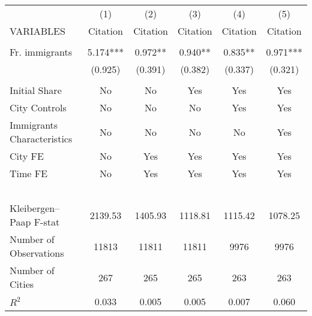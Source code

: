 \begin{tabular}{lccccc} \hline
 & (1) & (2) & (3) & (4) & (5) \\
VARIABLES & Citation & Citation & Citation & Citation & Citation \\ \hline
 &  &  &  &  &  \\
Fr. immigrants & 5.174*** & 0.972** & 0.940** & 0.835** & 0.971*** \\
 & (0.925) & (0.391) & (0.382) & (0.337) & (0.321) \\
 &  &  &  &  &  \\
Initial Share & No & No & Yes & Yes & Yes \\
City Controls & No & No & No & Yes & Yes \\
Immigrants Characteristics & No & No & No & No & Yes \\
City FE & No & Yes & Yes & Yes & Yes \\
Time FE & No & Yes & Yes & Yes & Yes \\
~ & ~ & ~ & ~ & ~ & ~ \\
Kleibergen–Paap F-stat & 2139.53 & 1405.93 & 1118.81 & 1115.42 & 1078.25 \\
Number of Observations & 11813 & 11811 & 11811 & 9976 & 9976 \\
Number of Cities & 267 & 265 & 265 & 263 & 263 \\
 $ R^2$ & 0.033 & 0.005 & 0.005 & 0.007 & 0.060 \\ \hline
\end{tabular}
